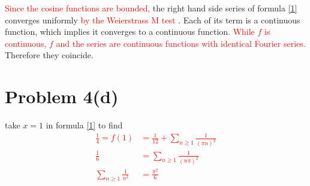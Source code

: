 \documentclass{article}
\begin{document}
\textcolor{red}{Since the cosine functions are bounded,}
the right hand side series of formula \ref{1} converges uniformly \textcolor{red}{by the Weierstrass M test} .
Each of its term is a continuous function, which implies it converges to a continuous function.\textcolor{red}{ While $f$ is continuous, $f$ and the series are continuous functions with identical Fourier series.} Therefore they coincide.


\section*{Problem 4(d)}
take $x=1$ in formula \ref{1} to find 
\textcolor{red}{
\begin{align*}
	\frac{1}{4}=f(1)&=\frac{1}{12}+\sum_{n\geq 1}\frac{1}{(\pi n)^2} \\
	\frac{1}{6}&=\sum_{n\geq 1}\frac{1}{(n\pi)^2}\\
	\sum_{n\geq 1}\frac{1}{n^2}&=\frac{\pi^2}{6}
\end{align*}
}
\end{document}
